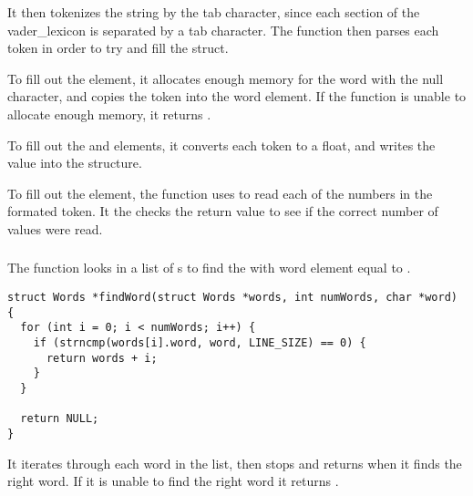 \documentclass{article}
\theoremstyle{mytheoremstyle}
\theoremstyle{mytheoremstyle}
\theoremstyle{myproblemstyle}
\begin{document}
    It then tokenizes the  string by the tab character, since each section of the \\vader\_lexicon is separated by a tab character. The function then parses each token in order to try and fill the  struct. 

    To fill out the  element, it allocates enough memory for the word with the null character, and copies the token into the word element. If the function is unable to allocate enough memory, it returns .

    To fill out the  and  elements, it converts each token to a float, and writes the value into the structure.

    To fill out the  element, the function uses  to read each of the numbers in the formated token. It the checks the return value to see if the correct number of values were read.

    \subsubsection{}

    The function looks in a list of s to find the  with word element equal to .

    \begin{lstlisting}
struct Words *findWord(struct Words *words, int numWords, char *word) {
  for (int i = 0; i < numWords; i++) {
    if (strncmp(words[i].word, word, LINE_SIZE) == 0) {
      return words + i;
    }
  }

  return NULL;
}
    \end{lstlisting}

    It iterates through each word in the list, then stops and returns when it finds the right word. If it is unable to find the right word it returns .

    \subsection{}
\end{document}
